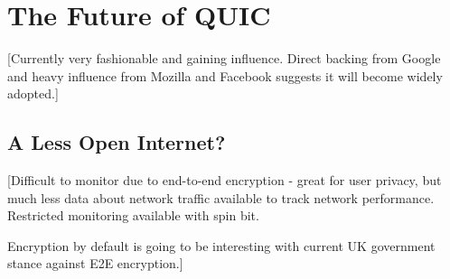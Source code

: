\documentclass{l4proj}
\begin{document}
\section{The Future of QUIC}
[Currently very fashionable and gaining influence. Direct backing from Google and heavy influence from Mozilla and Facebook suggests it will become widely adopted.]

\subsection{A Less Open Internet?}
[Difficult to monitor due to end-to-end encryption - great for user privacy, but much less data about network traffic available to track network performance. Restricted monitoring available with spin bit.

Encryption by default is going to be interesting with current UK government stance against E2E encryption.]



\end{document}
